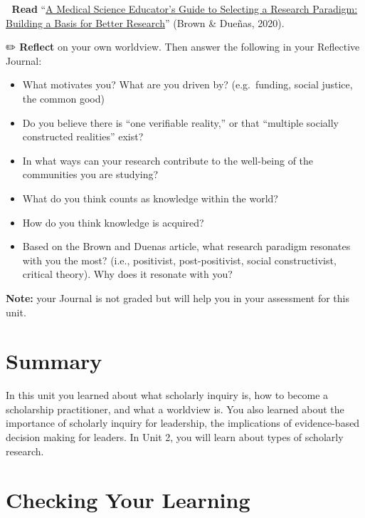 \documentclass[
  letterpaper,
  DIV=11,
  numbers=noendperiod]{scrreprt}
\providecommand{\tightlist}{%
  \setlength{\itemsep}{0pt}\setlength{\parskip}{0pt}}\usepackage{longtable,booktabs,array}
\begin{document}
📖 \textbf{Read}
``\href{https://www.researchgate.net/publication/338202096_A_Medical_Science_Educator\%27s_Guide_to_Selecting_a_Research_Paradigm_Building_a_Basis_for_Better_Research}{A
Medical Science Educator's Guide to Selecting a Research Paradigm:
Building a Basis for Better Research}'' (Brown \& Dueñas, 2020).

✏️ \textbf{Reflect} on your own worldview. Then answer the following in
your Reflective Journal:

\begin{itemize}
\tightlist
\item
  What motivates you? What are you driven by? (e.g.~funding, social
  justice, the common good)
\item
  Do you believe there is ``one verifiable reality,'' or that ``multiple
  socially constructed realities'' exist?
\item
  In what ways can your research contribute to the well-being of the
  communities you are studying?
\item
  What do you think counts as knowledge within the world?
\item
  How do you think knowledge is acquired?
\item
  Based on the Brown and Duenas article, what research paradigm
  resonates with you the most? (i.e., positivist, post-positivist,
  social constructivist, critical theory). Why does it resonate with
  you?
\end{itemize}

\textbf{Note:} your Journal is not graded but will help you in your
assessment for this unit.

\section*{Summary}\label{summary}


In this unit you learned about what scholarly inquiry is, how to become
a scholarship practitioner, and what a worldview is. You also learned
about the importance of scholarly inquiry for leadership, the
implications of evidence-based decision making for leaders. In Unit 2,
you will learn about types of scholarly research.

\section*{Checking Your Learning}\label{checking-your-learning}
\end{document}

